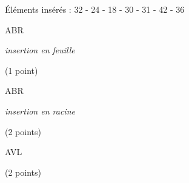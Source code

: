 \documentclass[11pt,a4paper]{article}
\begin{document}
\begin{center}

\'Eléments insérés : 32 - 24 - 18 - 30 - 31 - 42 - 36

\begin{table}[ht!]
  \centering
  \begin{minipage}{0.33\textwidth}
    \centering

\vspace*{7cm}

ABR

\textit{insertion en feuille}

(1 point)
  \end{minipage}
  \hfillx
  \begin{minipage}{0.33\textwidth}
    \centering

\vspace*{7cm}

ABR

\textit{insertion en racine}

(2 points)
  \end{minipage}
  \hfillx
  \begin{minipage}{0.33\textwidth}
    \centering

\vspace*{7cm}

AVL

(2 points)
  \end{minipage}
\end{table}


%
%
%
%
%

\end{center}

\end{document}
